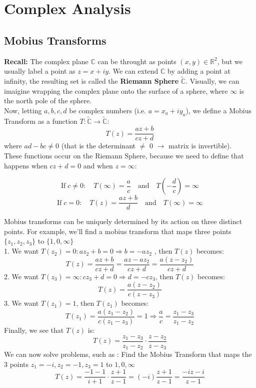 \documentclass[10pt]{article}
\begin{document}
\section{Complex Analysis}
    \subsection{Mobius Transforms}
        \textbf{Recall:} The complex plane $\mathbb{C}$ can be throught as points $(x,y) \in \mathbb{R}^2$, but we usually label a point as $z = x+iy$.
        We can extend $\mathbb{C}$ by adding a point at infinity, the resulting set is called the \textbf{Riemann Sphere} $\tilde{\mathbb{C}}$.
        Visually, we can imaigine wrapping the complex plane onto the surface of a sphere, where $\infty$ is the north pole of the sphere. \\[2ex]
        \noindent Now, letting $a,b,c,d$ be complex numbers (i.e. $ a = x_a + iy_a$), we define a Mobius Transform as a function $T:\tilde{\mathbb{C}} \to \tilde{\mathbb{C}}:$
        $$T(z) = \frac{az + b}{cz +d}$$
        where $ad -bc \neq 0$ (that is the determinant $\neq$ 0 $\rightarrow$ matrix is invertible). \\
        These functions occur on the Riemann Sphere, because we need to define that happens when $cz + d = 0$ and when $z = \infty$:
    
        $$\text{If} \;c \neq 0: \quad T(\infty) = \frac{a}{c} \quad \text{and} \quad T\left(-\frac{d}{c}\right) = \infty$$
        $$\text{If} \;c = 0: \quad T(z) = \frac{az + b}{d}\quad \text{and} \quad T(\infty) = \infty$$ 
        
        \noindent Mobius transforms can be  uniquely determined by its action on three distinct points. For example, we'll find a mobius transform that maps three points $\{z_1, z_2, z_3\}$ to $\{1,0,\infty\}$ \\[2ex]
        1. We want $T(z_2) = 0 : az_2 + b = 0 \Rightarrow b= -az_2$ , then $T(z)$ becomes: 
        $$T(z) = \frac{az + b}{cz + d} = \frac{az -az_2}{cz+d} = \frac{a(z-z_2)}{cz + d}$$
        2. We want $T(z_3) = \infty : cz_3 + d = 0 \Rightarrow d = -cz_3$, then $T(z)$ becomes:
        $$T(z) = \frac{a(z - z_2)}{c(z - z_3)}$$
        3. We want $T(z_1) = 1$, then $T(z_1)$ becomes:
        $$T(z_1) = \frac{a(z_1 - z_2)}{c(z_1 - z_3)} = 1 \Rightarrow \frac{a}{c} = \frac{z_1 - z_3}{z_1 - z_2}$$
        Finally, we see that $T(z)$ is:
        $$T(z) = \frac{z_1 - z_3}{z_1 - z_2}\cdot \frac{z - z_2}{z - z_3} $$
        We can now solve problems, such as : Find the Mobius Transform that maps the 3 points $z_1 = -i, z_2 = -1, z_3 = 1$ to $1,0,\infty$ 
        $$T(z) = \frac{-1 -1}{i + 1} \cdot \frac{z + 1}{z-1} = (-i)\frac{z+1}{z-1} = \frac{-iz -i}{z-1}$$
        
\end{document}

